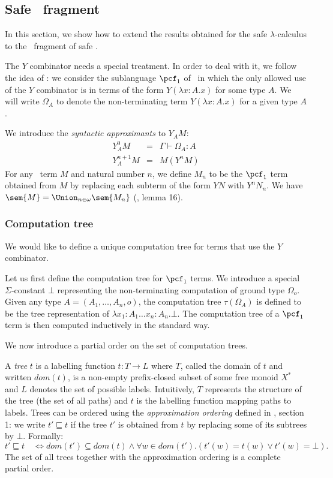 \subsection{Safe \pcf\ fragment}
In this section, we show how to extend the results obtained for the
safe $\lambda$-calculus to the \pcf\ fragment of safe \ialgol.

The $Y$ combinator needs a special treatment. In order to deal with
it, we follow the idea of \cite{abramsky:game-semantics-tutorial}:
we consider the sublanguage $\pcf_1$ of \pcf\ in which the only
allowed use of the $Y$ combinator is in terms of the form $Y(
\lambda x:A .x )$ for some type $A$. We will write $\Omega_A$ to
denote the non-terminating term $Y(\lambda x:A .x)$ for a given type
$A$.

We introduce the \emph{syntactic approximants} to $Y_A M$:
\begin{eqnarray*}
Y^0_A M &=& \Gamma \vdash \Omega_A : A\\
Y^{n+1}_A M &=& M( Y^n M )
\end{eqnarray*}
For any \pcf\ term $M$ and natural number $n$, we define $M_n$ to be
the $\pcf_1$ term obtained from $M$ by replacing each subterm of the
form $Y N$ with $Y^n N_n$. We have $\sem{M} = \Union_{n\in\omega}
\sem{M_n}$ (\cite{abramsky:game-semantics-tutorial}, lemma 16).


\subsubsection{Computation tree}

We would like to define a unique computation tree for terms that use
the $Y$ combinator.

Let us first define the computation tree for $\pcf_1$ terms. We
introduce a special $\Sigma$-constant $\bot$ representing the
non-terminating computation of ground type $\Omega_o$. Given any
type $A = (A_1, \ldots, A_n, o)$, the computation tree
$\tau(\Omega_A)$ is defined to be the tree representation of
$\lambda x_1:A_1 \ldots x_n:A_n . \bot$. The computation tree of a
$\pcf_1$ term is then computed inductively in the standard way.

We now introduce a partial order on the set of computation trees.

A \emph{tree} $t$ is a labelling function $t:T\rightarrow L$ where
$T$, called the domain of $t$ and written $dom(t)$, is a non-empty
prefix-closed subset of some free monoid $X^*$ and $L$ denotes the
set of possible labels. Intuitively, $T$ represents the structure of
the tree (the set of all paths) and $t$ is the labelling function
mapping paths to labels. Trees can be ordered using the
\emph{approximation ordering} defined in \cite{KNU02}, section 1: we
write $t' \sqsubseteq t$ if the tree $t'$ is obtained from $t$ by
replacing some of its subtrees by $\bot$. Formally:
$$t' \sqsubseteq t \quad \iff dom(t') \subseteq dom(t) \wedge \forall  w \in dom(t'). (t'(w) = t(w) \vee t'(w) = \bot).$$
The set of all trees together with the approximation ordering is a
complete partial order.

